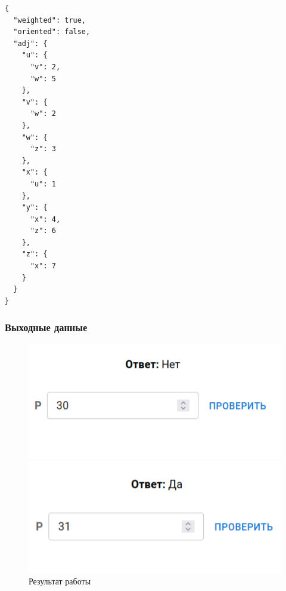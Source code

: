 \begin{verbatim}
{
  "weighted": true,
  "oriented": false,
  "adj": {
    "u": {
      "v": 2,
      "w": 5
    },
    "v": {
      "w": 2
    },
    "w": {
      "z": 3
    },
    "x": {
      "u": 1
    },
    "y": {
      "x": 4,
      "z": 6
    },
    "z": {
      "x": 7
    }
  }
}
\end{verbatim}

\subsubsection{Выходные данные}
\begin{figure}[H]
  \begin{minipage}{0.5\textwidth}
    \centering\includegraphics[width=0.8\linewidth]{figs/task-8/res-8-1.png}
  \end{minipage}
  \begin{minipage}{0.5\textwidth}
    \centering\includegraphics[width=0.8\linewidth]{figs/task-8/res-8-2.png}
  \end{minipage}
  \caption{Результат работы}
\end{figure}